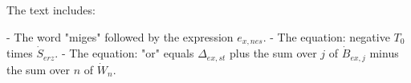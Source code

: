 The text includes:

- The word "miges" followed by the expression \( e_{x,nes} \).
- The equation: negative \( T_0 \) times \( \dot{S}_{erz} \).
- The equation: "or" equals \( \Delta_{ex,st} \) plus the sum over \( j \) of \( \dot{B}_{ex,j} \) minus the sum over \( n \) of \( \dot{W}_n \).